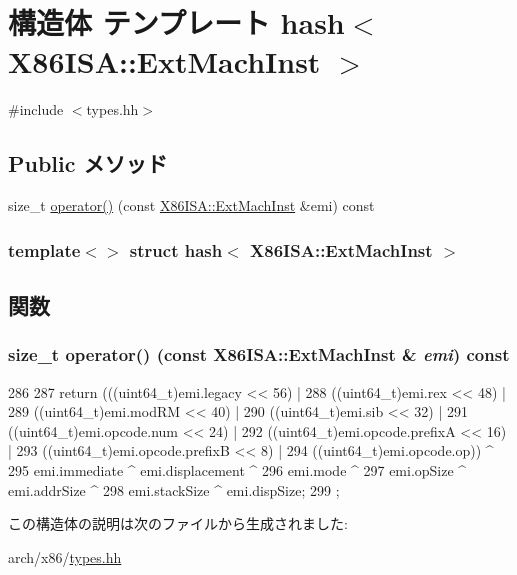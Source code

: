\hypertarget{structhash_3_01X86ISA_1_1ExtMachInst_01_4}{
\section{構造体 テンプレート hash$<$ X86ISA::ExtMachInst $>$}
\label{structhash_3_01X86ISA_1_1ExtMachInst_01_4}
}


{\ttfamily \#include $<$types.hh$>$}\subsection*{Public メソッド}
\begin{DoxyCompactItemize}
\item 
size\_\-t \hyperlink{structhash_3_01X86ISA_1_1ExtMachInst_01_4_ad72b15ff5c9f86aca62e81eb4e098a52}{operator()} (const \hyperlink{structX86ISA_1_1ExtMachInst}{X86ISA::ExtMachInst} \&emi) const 
\end{DoxyCompactItemize}
\subsubsection*{template$<$$>$ struct hash$<$ X86ISA::ExtMachInst $>$}



\subsection{関数}
\hypertarget{structhash_3_01X86ISA_1_1ExtMachInst_01_4_ad72b15ff5c9f86aca62e81eb4e098a52}{
\subsubsection[{operator()}]{\setlength{\rightskip}{0pt plus 5cm}size\_\-t operator() (const {\bf X86ISA::ExtMachInst} \& {\em emi}) const}}
\label{structhash_3_01X86ISA_1_1ExtMachInst_01_4_ad72b15ff5c9f86aca62e81eb4e098a52}



\begin{DoxyCode}
286                                                               {
287             return (((uint64_t)emi.legacy << 56) |
288                     ((uint64_t)emi.rex  << 48) |
289                     ((uint64_t)emi.modRM << 40) |
290                     ((uint64_t)emi.sib << 32) |
291                     ((uint64_t)emi.opcode.num << 24) |
292                     ((uint64_t)emi.opcode.prefixA << 16) |
293                     ((uint64_t)emi.opcode.prefixB << 8) |
294                     ((uint64_t)emi.opcode.op)) ^
295                     emi.immediate ^ emi.displacement ^
296                     emi.mode ^
297                     emi.opSize ^ emi.addrSize ^
298                     emi.stackSize ^ emi.dispSize;
299         };
\end{DoxyCode}


この構造体の説明は次のファイルから生成されました:\begin{DoxyCompactItemize}
\item 
arch/x86/\hyperlink{arch_2x86_2types_8hh}{types.hh}\end{DoxyCompactItemize}
